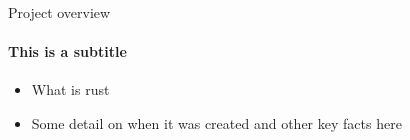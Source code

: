 
\begin{frame}{Project overview}
    \framesubtitle{This is a subtitle}
    \begin{itemize}
        \item What is rust
        \item Some detail on when it was created and other key facts here
    \end{itemize}

\end{frame}

